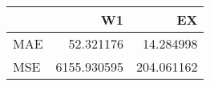 \begin{tabular}{lrr}
\toprule
{} &           W1 &          EX \\
\midrule
MAE &    52.321176 &   14.284998 \\
MSE &  6155.930595 &  204.061162 \\
\bottomrule
\end{tabular}
